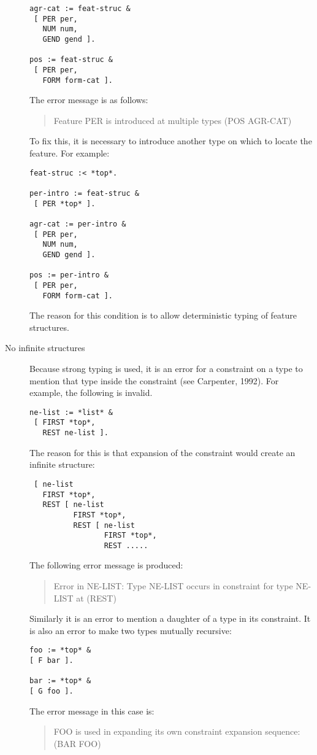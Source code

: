 \documentclass[12pt]{report}
\newenvironment{error}%
{\begin{quote}
\tt
}%
{\end{quote}
}
\begin{document}
\begin{description}
\begin{verbatim}
agr-cat := feat-struc &
 [ PER per,
   NUM num,
   GEND gend ].

pos := feat-struc &
 [ PER per,
   FORM form-cat ].
\end{verbatim}
The error message is as follows:
\begin{error}
Feature PER is introduced at multiple types (POS AGR-CAT)
\end{error} 
To fix this, it is necessary to introduce another type on which to
locate the feature.  For example:
\begin{verbatim}
feat-struc :< *top*.

per-intro := feat-struc &
 [ PER *top* ].

agr-cat := per-intro &
 [ PER per,
   NUM num,
   GEND gend ].

pos := per-intro &
 [ PER per,
   FORM form-cat ].
\end{verbatim}

The reason for this condition is to allow deterministic 
typing of feature structures.                      
\item[No infinite structures]
Because strong typing is used, it is an error for a constraint on a type
to mention that type inside the constraint (see Carpenter, 1992).  
For example, the following is
invalid.
\begin{verbatim}
ne-list := *list* &
 [ FIRST *top*,
   REST ne-list ].
\end{verbatim}
The reason for this is that expansion of the constraint 
would create an infinite 
structure:
\begin{verbatim}
 [ ne-list
   FIRST *top*,
   REST [ ne-list
          FIRST *top*,
          REST [ ne-list
                 FIRST *top*,
                 REST .....
\end{verbatim}
The following error message is produced:
\begin{error}
Error in NE-LIST: 
  Type NE-LIST occurs in constraint for type NE-LIST at (REST)
\end{error}
Similarly it is an error to mention a daughter of a type in its
constraint.  It is also an error to make two types mutually
recursive:
\begin{verbatim}
foo := *top* &
[ F bar ].

bar := *top* &
[ G foo ].
\end{verbatim}
The error message in this case is:
\begin{error}
FOO is used in expanding its own constraint 
                    expansion sequence: (BAR FOO)
\end{error}



\end{description}
\end{document}
